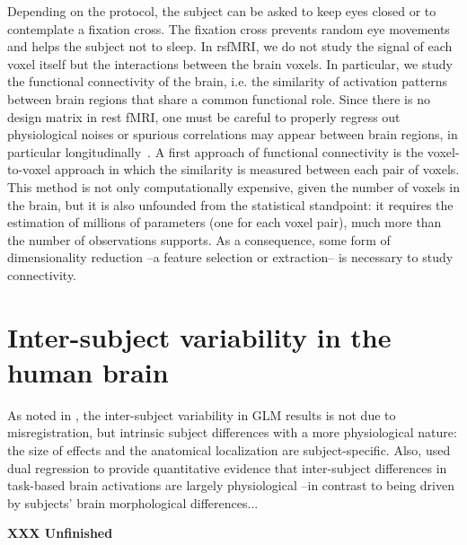 Depending on the protocol, the subject can be asked to keep eyes closed or
to contemplate a fixation cross. The fixation cross prevents random eye movements
and helps the subject not to sleep.
In rsfMRI, we do not study the signal of each voxel itself but the
interactions between the brain voxels. In particular, we study the functional
connectivity of the brain, i.e. the similarity of activation patterns between
brain regions that share a common functional role. Since there is no design
matrix in rest fMRI, one must be careful to properly regress out physiological
noises or spurious correlations may appear between brain regions, in particular
longitudinally~\citep{power2012,vandijk2012}.
A first approach of functional connectivity is the voxel-to-voxel approach in
which the similarity is measured between each pair of voxels. This method is
not only computationally expensive, given the number of voxels in the brain,
but it is also unfounded from the statistical standpoint: it requires the
estimation of millions of parameters (one for each voxel pair), much more than the number of observations
supports. As a consequence, some form of dimensionality reduction --a feature
selection or extraction-- is necessary to study connectivity.



\section{Inter-subject variability in the human brain}
As noted in
\citep{thirion2007analysis,pmid22425669}, the inter-subject variability
in GLM results is not due to misregistration, but intrinsic subject
differences with a more physiological nature: the size of effects and
the anatomical localization are subject-specific. Also, \citep{tavor2016task} used
dual regression \citep{Filippini2009} to provide quantitative evidence that inter-subject
differences in task-based brain activations are largely physiological --in contrast to being driven
by subjects' brain morphological differences...

\textbf{XXX Unfinished}



